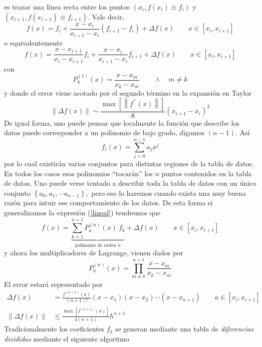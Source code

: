\documentclass[spanish,titlepage,11pt]{article}
\begin{document}
es trazar una l\'{i}nea recta entre los puntos $\left(  x_{i},f\left(
x_{i}\right)  \equiv f_{i}\right)  $ y $\left(  x_{i+1},f\left(
x_{i+1}\right)  \equiv f_{i+1}\right)  .$ Vale decir,
\begin{equation}
f(x)=f_{i}+\frac{x-x_{i}}{x_{i+1}-x_{i}}\left(  f_{i+1}-f_{i}\right)  +\Delta
f(x)\qquad x\in\left[  x_{i},x_{i+1}\right]
\end{equation}
o equivalentemente
\begin{equation}
f(x)=\frac{x-x_{i+1}}{x_{i}-x_{i+1}}f_{i}+\frac{x-x_{i}}{x_{i+1}-x_{i}}%
f_{i+1}+\Delta f(x)\qquad x\in\left[  x_{i},x_{i+1}\right]  \label{lineal}%
\end{equation}
con
\begin{equation}
P_{k}^{(1)}(x)=\frac{x-x_{m}}{x_{k}-x_{m}}\qquad\wedge\quad m\neq k
\end{equation}
y donde el error viene acotado por el segundo t\'{e}rmino en la expansi\'{o}n
en Taylor
\begin{equation}
\left\|  \Delta f(x)\right\|  \sim\frac{\max\left[  \left\|  f^{\prime\prime
}(x)\right\|  \right]  }{8}\left(  x_{i+1}-x_{i}\right)  ^{2}%
\end{equation}
De igual forma, uno puede pensar que localmente la funci\'{o}n que describe
los datos puede corresponder a un polinomio de bajo grado, digamos $\left(
n-1\right)  $. As\'{i}
\begin{equation}
f_{i}(x)=\sum_{j=0}^{n-1}a_{j}x^{j}%
\end{equation}
por lo cual existir\'{a}n varios conjuntos para distintas regiones de la tabla
de datos. En todos los casos esos polinomios ``tocar\'{a}n'' los $n$ puntos
contenidos en la tabla de datos. Uno puede verse tentado a describir toda la
tabla de datos con un \'{u}nico conjunto $\left\{  a_{0},a_{1},\cdots
a_{n-1}\right\}  ,$ pero eso lo haremos cuando exista una muy buena raz\'{o}n
para intuir ese comportamiento de los datos. De esta forma si generalizamos la
expresi\'{o}n (\ref{lineal}) tendremos que
\begin{equation}
f(x)=\underset{\text{polinomio de orden }n}{\underbrace{\sum_{k=1}^{n+1}%
P_{k}^{(n)}(x)\ f_{k}}}+\Delta f(x)\qquad x\in\left[  x_{i},x_{i+1}\right]
\end{equation}
y ahora los multiplicadores de Lagrange, vienen dados por
\begin{equation}
P_{k}^{(n)}(x)=\prod_{m\neq k}^{n+1}\frac{x-x_{m}}{x_{k}-x_{m}}%
\end{equation}
El error estar\'{a} representado por
\begin{align}
\Delta f(x)  &  =\frac{f^{\left(  n+1\right)  }\left(  a\right)  }{\left(
n+1\right)  !}\left(  x-x_{1}\right)  \left(  x-x_{2}\right)  \cdots\left(
x-x_{n+1}\right)  \qquad a\in\left[  x_{i},x_{i+1}\right] \\
\left\|  \Delta f(x)\right\|   &  \leq\frac{\max\left[  f^{\left(  n+1\right)
}\left(  a\right)  \right]  }{4\left(  n+1\right)  }h^{n+1}%
\end{align}
Tradicionalmente los coeficientes $f_{k}$ se generan mediante una tabla de
\textit{diferencias divididas} mediante el siguiente algoritmo
\end{document}
